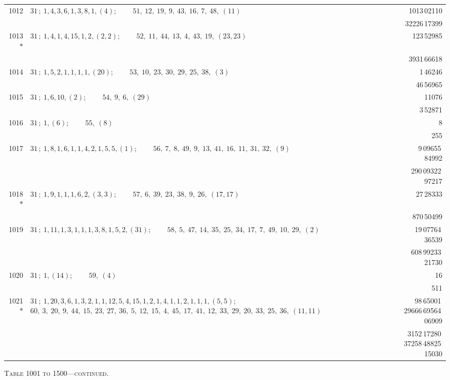 \documentclass[11pt]{article}
\providecommand{\asterism}{*}
\begin{document}
\begin{longtable}{|r|p{}|r|}
\hline
1012 & $31\,;\ 1, 4, 3, 6, 1, 3, 8, 1, (4)$; \ \ \ \ $51,\ 12,\ 19,\ 9,\ 43,\ 16,\ 7,\ 48,\ (11)$ & 1013\,02110 \\
 & & 32226\,17399 \\
\hline
1013$\asterism$ & $31\,;\ 1, 4, 1, 4, 15, 1, 2, (2, 2)$; \ \ \ \ $52,\ 11,\ 44,\ 13,\ 4,\ 43,\ 19,\ (23, 23)$ & 123\,52985 \\
 & & 3931\,66618 \\
\hline
1014 & $31\,;\ 1, 5, 2, 1, 1, 1, 1, (20)$; \ \ \ \ $53,\ 10,\ 23,\ 30,\ 29,\ 25,\ 38,\ (3)$ & 1\,46246 \\
 & & 46\,56965 \\
\hline
1015 & $31\,;\ 1, 6, 10, (2)$; \ \ \ \ $54,\ 9,\ 6,\ (29)$ & 11076 \\
 & & 3\,52871 \\
\hline
1016 & $31\,;\ 1, (6)$; \ \ \ \ $55,\ (8)$ & 8 \\
 & & 255 \\
\hline
1017 & $31\,;\ 1, 8, 1, 6, 1, 1, 4, 2, 1, 5, 5, (1)$; \ \ \ \ $56,\ 7,\ 8,\ 49,\ 9,\ 13,\ 41,\ 16,\ 11,\ 31,\ 32,\ (9)$ & 9\,09655\,84992 \\
 & & 290\,09322\,97217 \\
\hline
1018$\asterism$ & $31\,;\ 1, 9, 1, 1, 1, 6, 2, (3, 3)$; \ \ \ \ $57,\ 6,\ 39,\ 23,\ 38,\ 9,\ 26,\ (17, 17)$ & 27\,28333 \\
 & & 870\,50499 \\
\hline
1019 & $31\,;\ 1, 11, 1, 3, 1, 1, 1, 3, 8, 1, 5, 2, (31)$; \ \ \ \ $58,\ 5,\ 47,\ 14,\ 35,\ 25,\ 34,\ 17,\ 7,\ 49,\ 10,\ 29,\ (2)$ & 19\,07764\,36539 \\
 & & 608\,99233\,21730 \\
\hline
1020 & $31\,;\ 1, (14)$; \ \ \ \ $59,\ (4)$ & 16 \\
 & & 511 \\
\hline
1021$\asterism$ & $31\,;\ 1, 20, 3, 6, 1, 3, 2, 1, 1, 12, 5, 4, 15, 1, 2, 1, 4, 1, 1, 2, 1, 1, 1, (5, 5)$; \ \ \ \ $60,\ 3,\ 20,\ 9,\ 44,\ 15,\ 23,\ 27,\ 36,\ 5,\ 12,\ 15,\ 4,\ 45,\ 17,\ 41,\ 12,\ 33,\ 29,\ 20,\ 33,\ 25,\ 36,\ (11, 11)$ & 98\,65001\,29666\,69564\,06909 \\
 & & 3152\,17280\,37258\,48825\,15030 \\
\hline
\end{longtable}

\begin{center}
\small\textsc{Table 1001 to 1500---continued.}
\end{center}
\end{document}
